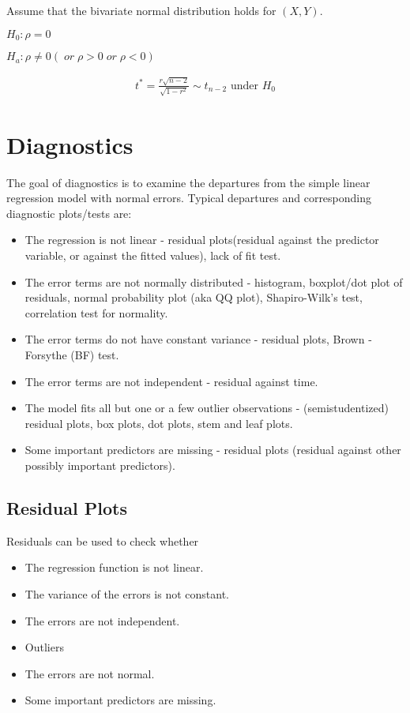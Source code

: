 \documentclass[10pt]{article}
\newcommand{\hlEmph}[1]{\colorbox{DarkSeaGreen2}{#1}}
\begin{document}
\begin{multicols}{3}
    Assume that the bivariate normal distribution holds for $(X,Y)$.

    $H_0: \rho = 0$

    $H_a: \rho \ne 0 (\;or\; \rho > 0 \;or\; \rho < 0)$

    \begin{eqnarray}\label{eq: t statistic for rho}
        t^* = \frac{r\sqrt{n-2}}{\sqrt{1-r^2}} \sim t_{n-2} \text{ under } H_0
    \end{eqnarray}

    \section{Diagnostics}

    The goal of diagnostics is to examine the departures from the simple linear regression model with normal errors. Typical departures and corresponding diagnostic plots/tests are:

    \begin{itemize}
        \item The regression is not \hlEmph{linear} - residual plots(residual against the predictor variable, or against the fitted values), lack of fit test.
        \item The error terms are not \hlEmph{normally} distributed - histogram, boxplot/dot plot of residuals, normal probability plot (aka QQ plot), Shapiro-Wilk's test, correlation test for normality.
        \item The error terms do not have \hlEmph{constant variance} - residual plots, Brown - Forsythe (BF) test.
        \item The error terms are not \hlEmph{independent} - residual against time.
        \item The model fits all but one or a few \hlEmph{outlier} observations - (semistudentized) residual plots, box plots, dot plots, stem and leaf plots.
        \item Some important \hlEmph{predictors are missing} - residual plots (residual against other possibly important predictors).
    \end{itemize}

    \subsection{Residual Plots}

    Residuals can be used to check whether
    \begin{itemize}
        \item The regression function is not linear.
        \item The variance of the errors is not constant.
        \item The errors are not independent.
        \item Outliers
        \item The errors are not normal.
        \item Some important predictors are missing.
    \end{itemize}


\end{multicols}
\end{document}
